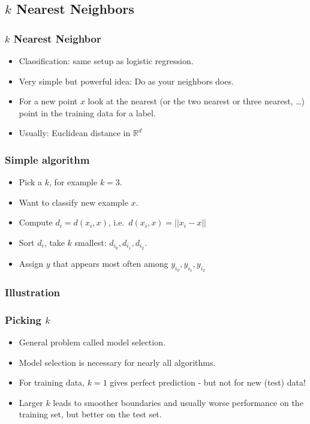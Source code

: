 \subsection{$k$ Nearest Neighbors}
\begin{frame}
    \frametitle{$k$ Nearest Neighbor}
    \begin{itemize}
        \item Classification: same setup as logistic regression.
        \item Very simple but powerful idea: Do as your neighbors does.
        \item For a new point $x$ look at the nearest (or the two nearest or three nearest, \ldots)
            point in the training data for a label.
        \item Usually: Euclidean distance in $\mathbb{R}^d$
    \end{itemize}
\end{frame}

\begin{frame}
    \frametitle{Simple algorithm}
    \begin{itemize}
        \item Pick a $k$, for example $k=3$.
        \item Want to classify new example $x$.
        \item Compute $d_i = d(x_i, x)$, i.e.\, $d(x_i, x) = ||x_i - x||$
        \item Sort $d_i$, take $k$ smallest: $d_i_0, d_i_1, d_i_2$.
        \item Assign $y$ that appears most often among $y_i_0, y_i_1, y_i_2$
    \end{itemize}
\end{frame}

\begin{frame}
    \frametitle{Illustration}
\end{frame}

\begin{frame}
    \frametitle{Picking $k$}
    \begin{itemize}
        \item General problem called model selection.
        \item Model selection is necessary for nearly all algorithms.
        \item For training data, $k=1$ gives perfect prediction - but not for new (test) data!
        \item Larger $k$ leads to smoother boundaries and usually worse performance on the training set,
            but better on the test set.
    \end{itemize}
\end{frame}


